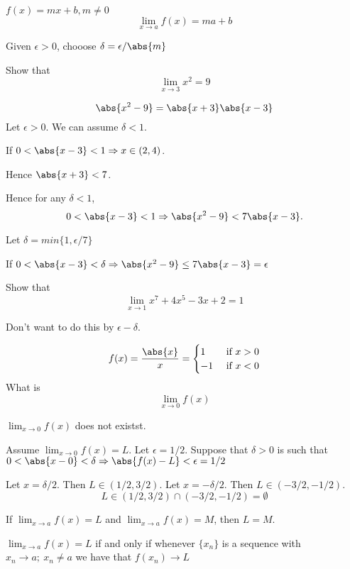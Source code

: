 \begin{exmp}
$f(x) = mx + b, m\neq 0$
\[\lim_{x\to a} f(x) = ma + b\]
\end{exmp}
\begin{solution}
Given $\epsilon > 0$, chooose $\delta = \epsilon / \abs{m}$
\end{solution}

\begin{exmp}
Show that \[\lim_{x\to 3} x^2 = 9\]
\end{exmp}
\begin{solution}
\[\abs{x^2-9} = \abs{x+3}\abs{x-3}\]
Let $\epsilon > 0$. We can assume $\delta < 1$.

If $0<\abs{x-3}<1 \Rightarrow x\in (2,4)$.

Hence $\abs{x+3} < 7$.

Hence for any $\delta < 1$, \[0 < \abs{x-3} < 1 \Rightarrow \abs{x^2-9} < 7\abs{x-3}.\]

Let $\delta = min\{1,\epsilon / 7\}$

If $0 < \abs{x-3} < \delta \Rightarrow \abs{x^2-9} \leq 7\abs{x-3} = \epsilon$
\end{solution}

\begin{exmp}
Show that \[\lim_{x\to 1} x^7+4x^5-3x+2 = 1\]
\end{exmp}
\begin{solution}
Don't want to do this by $\epsilon - \delta$.
\end{solution}

\begin{exmp}
\begin{equation*}
    f(x) = \frac{\abs{x}}{x} = \begin{cases}
     1 & \text{ if } x > 0 \\
     -1 & \text{ if } x < 0
    \end{cases}
\end{equation*}
What is \[\lim_{x\to 0} f(x)\]
\end{exmp}
\begin{solution}
$\lim_{x\to 0} f(x)$ does not existst.

Assume $\lim_{x\to 0} f(x) = L$. Let $\epsilon = 1/2$. Suppose that $\delta > 0$ is such that $0 < \abs{x-0} < \delta \Rightarrow \abs{f(x) - L} < \epsilon = 1/2$

Let $x = \delta / 2$. Then $L\in (1/2, 3/2)$. Let $x = - \delta / 2$. Then $L\in (-3/2,-1/2)$.
\[L\in (1/2, 3/2)\cap (-3/2,-1/2) = \emptyset  \]
\end{solution}

\begin{thm}
If $\lim_{x\to a} f(x) = L$ and $\lim_{x\to a} f(x) = M$, then $L = M$.
\end{thm}

\begin{thm}
$\lim_{x\to a} f(x) = L$ if and only if whenever $\{x_n\}$ is a sequence with $x_n\to a;\ x_n\neq a$ we have that $f(x_n) \to L$
\end{thm}